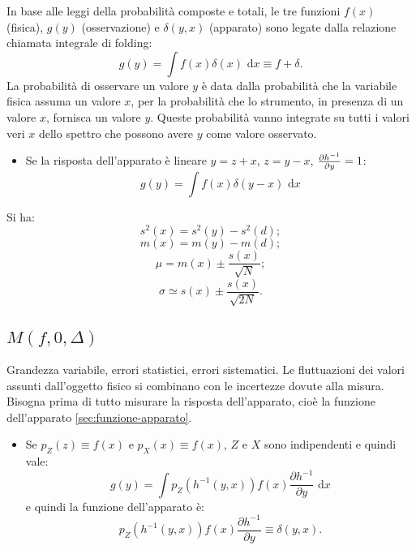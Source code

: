 In base alle leggi della probabilità composte e totali, le tre funzioni $f(x)$ (fisica), $g(y)$ (osservazione) e $\delta(y,x)$ (apparato) sono legate dalla relazione chiamata integrale di folding:
\begin{equation}
\label{eq:integrale-folding}
g\left( y \right) =\int { f\left( x \right) \delta \left( x \right) \textrm{ d}x } \equiv f+\delta .
\end{equation}
La probabilità di osservare un valore $y$ è data dalla probabilità che la variabile fisica assuma un valore $x$, per la probabilità che lo strumento, in presenza di un valore $x$, fornisca un valore $y$. Queste probabilità vanno integrate su tutti i valori veri $x$ dello spettro che possono avere $y$ come valore osservato.
\begin{itemize}
\item Se la risposta dell'apparato è lineare $y=z+x$, $z=y-x$, $\frac { \partial { h }^{ -1 } }{ \partial y } =1\\ $:
\begin{equation}
g\left( y \right) =\int { f\left( x \right) \delta \left( y-x \right) \textrm{ d}x } 
\end{equation}
\end{itemize}

Si ha:
\begin{equation}
{ s }^{ 2 }\left( x \right) ={ s }^{ 2 }\left( y \right) -s^{ 2 }\left( d \right) ;
\end{equation}
\begin{equation}
m\left( x \right) =m\left( y \right) -m\left( d \right) ;
\end{equation}
\begin{equation}
\mu =m(x)\pm \frac { s\left( x \right)  }{ \sqrt { N }  } ;
\end{equation}
\begin{equation}
\sigma \simeq s\left( x \right) \pm \frac { s\left( x \right)  }{ \sqrt { 2N }  } .
\end{equation}

\subsection{$M\left( f,0,\Delta \right) $} %
\label{subsec:f0D}
Grandezza variabile, errori statistici, errori sistematici. Le fluttuazioni dei valori assunti dall'oggetto fisico si combinano con le incertezze dovute alla misura. 
\\ Bisogna prima di tutto misurare la risposta dell'apparato, cioè la funzione dell'apparato \ref{sec:funzione-apparato}.
\begin{itemize}
\item Se $p_Z(z)\equiv f(x)$ e $p_X(x)\equiv f(x)$, $Z$ e $X$ sono indipendenti e quindi vale:
\[
g\left( y \right) =\int { { p }_{ Z }\left( { h }^{ -1 }\left( y,x \right)  \right) f\left( x \right) \frac { \partial { h }^{ -1 } }{ \partial y } \textrm{ d}x } 
\]
e quindi la funzione dell'apparato è:
\[
{ p }_{ Z }\left( { h }^{ -1 }\left( y,x \right)  \right) f\left( x \right) \frac { \partial { h }^{ -1 } }{ \partial y } \equiv \delta \left( y,x \right) .
\]
\end{itemize}


